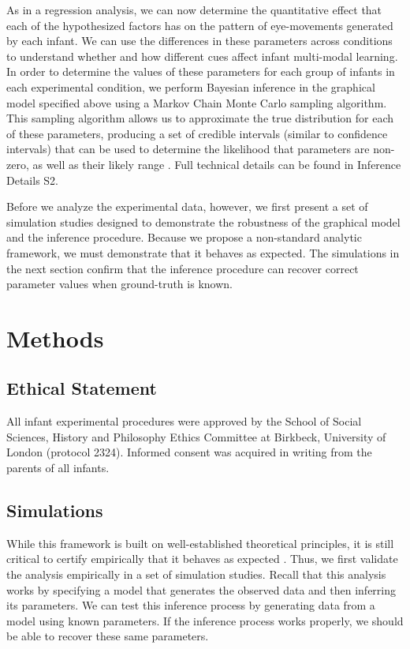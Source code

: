 \documentclass[12pt]{article}
\begin{document}
	As in a regression analysis, we can now determine the quantitative effect that each of the hypothesized factors has on the pattern of eye-movements generated by each infant. We can use the differences in these parameters across conditions to understand whether and how different cues affect infant multi-modal learning. In order to determine the values of these parameters for each group of infants in each experimental condition, we perform Bayesian inference in the graphical model specified above using a Markov Chain Monte Carlo sampling algorithm. This sampling algorithm allows us to approximate the true distribution for each of these parameters, producing a set of credible intervals (similar to confidence intervals) that can be used to determine the likelihood that parameters are non-zero, as well as their likely range \cite{Edwards1963, Kruschke2011}. Full technical details can be found in Inference Details S2.

	Before we analyze the experimental data, however, we first present a set of simulation studies designed to demonstrate the robustness of the graphical model and the inference procedure. Because we propose a non-standard analytic framework, we must demonstrate that it behaves as expected. The simulations in the next section confirm that the inference procedure can recover correct parameter values when ground-truth is known.

\section*{Methods}

\subsection*{Ethical Statement}

All infant experimental procedures were approved by the School of Social Sciences, History and Philosophy Ethics Committee at Birkbeck, University of London (protocol 2324). Informed consent was acquired in writing from the parents of all infants.

\subsection*{Simulations}
	While this framework is built on well-established theoretical principles, it is still critical to certify empirically that it behaves as expected \cite{Glymour1998}. Thus, we first validate the analysis empirically in a set of simulation studies. Recall that this analysis works by specifying a model that generates the observed data and then inferring its parameters. We can test this inference process by generating data from a model using known parameters. If the inference process works properly, we should be able to recover these same parameters. 
\end{document}
